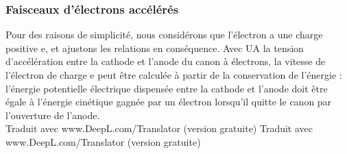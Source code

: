 \documentclass[../main.tex]{subfiles}
\begin{document}
\subsubsection{Faisceaux d'électrons accélérés}
Pour des raisons de simplicité, nous considérons que l'électron a une charge positive e, et ajustons les relations en conséquence. Avec UA la tension d'accélération entre la cathode et l'anode du canon à électrons, la vitesse de l'électron de charge e peut être calculée à partir de la conservation de l'énergie : l'énergie potentielle électrique dispensée entre la cathode et l'anode doit être égale à l'énergie cinétique gagnée par un électron lorsqu'il quitte le canon par l'ouverture de l'anode.\\

Traduit avec www.DeepL.com/Translator (version gratuite)
Traduit avec www.DeepL.com/Translator (version gratuite)
\end{document}
